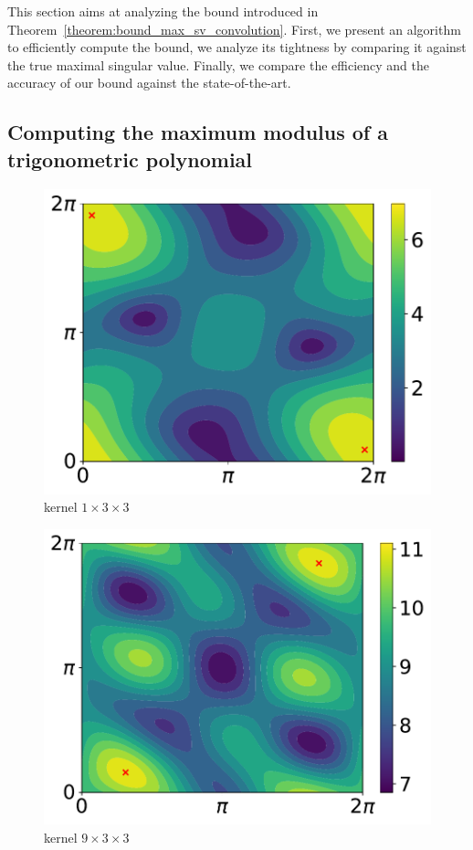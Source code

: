 This section aims at analyzing the bound introduced in Theorem~\ref{theorem:bound_max_sv_convolution}.
First, we present an algorithm to efficiently compute the bound, we analyze its tightness by comparing it against the true maximal singular value.
Finally, we compare the efficiency and the accuracy of our bound against the state-of-the-art. 

\subsection{Computing the maximum modulus of a trigonometric polynomial}\label{subsection:computing_max_modulus_trig_polynomial}


\begin{figure}[htb]
  \centering
  \begin{minipage}{.24\linewidth}
    \centering
    \includegraphics[scale=0.23]{figures/part2/ch9-singular_value_bound/contour_poly_200_1_1_3.pdf}\\kernel $1\times3\times3$
  \end{minipage}
  \begin{minipage}{.24\linewidth}
      \centering
      \includegraphics[scale=0.23]{figures/part2/ch9-singular_value_bound/contour_poly_200_1_9_3.pdf}\\kernel $9\times3\times3$

\end{minipage}
\end{figure}
